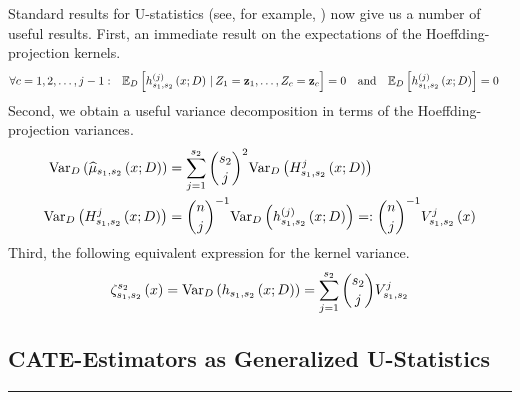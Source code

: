 Standard results for U-statistics (see, for example, \citet{lee_u-statistics_2019}) now give us a number of useful results.
First, an immediate result on the expectations of the Hoeffding-projection kernels.
\begin{align}\label{eq:H_k_expectation}
	\forall c = 1,2,\dotsc, j-1: \quad & \mathbb{E}_{D}\left[h_{s_1, s_2}^{(j)}\left(x; D\right) \, | \, Z_1 = \mathbf{z}_1, \dotsc, Z_c = \mathbf{z}_c\right] = 0
	\quad \text{and} \quad
	\mathbb{E}_{D}\left[h_{s_1, s_2}^{(j)}\left(x; D\right)\right] = 0
\end{align}
Second, we obtain a useful variance decomposition in terms of the Hoeffding-projection variances.
\begin{align}\label{eq:Var_decomp}
	\text{Var}_{D}\left(\widehat{\mu}_{s_1, s_2}\left(x; D\right)\right)
	 & = \sum_{j = 1}^{s_2} \binom{s_2}{j}^2 \text{Var}_{D}\left(H_{s_1, s_2}^{j}\left(x; D\right)\right) \\
	\text{Var}_{D}\left(H_{s_1, s_2}^{j}\left(x; D\right)\right)
	 & = \binom{n}{j}^{-1} \text{Var}_{D}\left(h_{s_1, s_2}^{(j)}\left(x; D\right)\right)
	=: \binom{n}{j}^{-1} V_{s_1, s_2}^{j}\left(x\right)
\end{align}
Third, the following equivalent expression for the kernel variance.
\begin{equation}\label{eq:k_var}
	\zeta_{s_1, s_2}^{s_2}\left(x\right)
	= \text{Var}_{D}\left(h_{s_1, s_2}\left(x; D\right)\right)
	= \sum_{j = 1}^{s_2} \binom{s_2}{j}V_{s_1, s_2}^{j}
\end{equation}

\subsection{CATE-Estimators as Generalized U-Statistics}
\hrule

